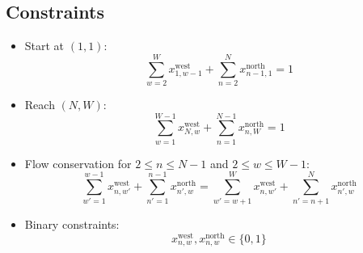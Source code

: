 \documentclass{article}
\begin{document}
\subsection*{Constraints}
\begin{itemize}
    \item Start at \((1, 1)\): 
    \[
    \sum_{w=2}^{W} x_{1,w-1}^{\text{west}} + \sum_{n=2}^{N} x_{n-1,1}^{\text{north}} = 1
    \]

    \item Reach \((N, W)\):
    \[
    \sum_{w=1}^{W-1} x_{N,w}^{\text{west}} + \sum_{n=1}^{N-1} x_{n,W}^{\text{north}} = 1
    \]

    \item Flow conservation for \( 2 \leq n \leq N-1 \) and \( 2 \leq w \leq W-1 \):
    \[
    \sum_{w'=1}^{w-1} x_{n,w'}^{\text{west}} + \sum_{n'=1}^{n-1} x_{n',w}^{\text{north}} = \sum_{w'=w+1}^{W} x_{n,w'}^{\text{west}} + \sum_{n'=n+1}^{N} x_{n',w}^{\text{north}}
    \]

    \item Binary constraints:
    \[
    x_{n,w}^{\text{west}}, x_{n,w}^{\text{north}} \in \{0, 1\}
    \]
\end{itemize}
\end{document}
